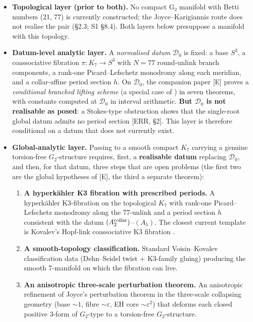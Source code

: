 \documentclass[11pt,a4paper]{article}
\begin{document}
\begin{itemize}
\tightlist
\item
  \textbf{Topological layer (prior to both).} No compact G₂ manifold with Betti numbers (21, 77) is currently constructed; the Joyce--Karigiannis route does not realise the pair (§2.3; S1 §8.4). Both layers below presuppose a manifold with this topology.
\item
  \textbf{Datum-level analytic layer.} A \emph{normalised datum} \(\mathcal D_0\) is fixed: a base \(S^3\), a coassociative fibration \(\pi: K_7 \to S^3\) with \(N = 77\) round-unlink branch components, a rank-one Picard--Lefschetz monodromy along each meridian, and a collar-affine period section \(h\). On \(\mathcal D_0\), the companion paper {[}E{]} proves a \emph{conditional branched lifting scheme} (a special case of \cite[Conjecture 1]{53}) in seven theorems, with constants computed at \(\mathcal D_0\) in interval arithmetic. \textbf{But \(\mathcal D_0\) is not realisable as posed}: a Stokes-type obstruction shows that the single-root global datum admits no period section {[}ERR, §2{]}. This layer is therefore conditional on a datum that does not currently exist.
\item
  \textbf{Global-analytic layer.} Passing to a smooth compact \(K_7\) carrying a genuine torsion-free \(G_2\)-structure requires, first, a \textbf{realisable datum} replacing \(\mathcal D_0\), and then, for that datum, three steps that are open problems (the first two are the global hypotheses of {[}E{]}, the third a separate theorem):

  \begin{enumerate}
  \def\labelenumi{\arabic{enumi}.}
  \tightlist
  \item
    \textbf{A hyperkähler K3 fibration with prescribed periods.} A hyperkähler K3-fibration on the topological \(K_7\) with rank-one Picard--Lefschetz monodromy along the 77-unlink and a period section \(h\) consistent with the datum \((A_2^{\rm collar})\)--\((A_5)\). The closest current template is Kovalev's Hopf-link coassociative K3 fibration \cite{13}.
  \item
    \textbf{A smooth-topology classification.} Standard Voisin--Kovalev classification data \cite{21} (Dehn--Seidel twist + K3-family gluing) producing the smooth 7-manifold on which the fibration can live.
  \item
    \textbf{An anisotropic three-scale perturbation theorem.} An anisotropic refinement of Joyce's perturbation theorem in the three-scale collapsing geometry (base \(\sim 1\), fibre \(\sim \varepsilon\), EH core \(\sim \varepsilon^2\)) that deforms each closed positive \(3\)-form of \(G_2\)-type to a torsion-free \(G_2\)-structure.
  \end{enumerate}
\end{itemize}
\end{document}
